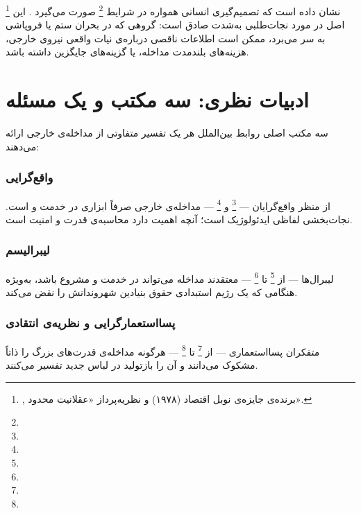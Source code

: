 %
\footnote{,
برنده‌ی جایزه‌ی نوبل اقتصاد (۱۹۷۸) و نظریه‌پرداز «عقلانیت محدود».}
نشان داده است که تصمیم‌گیری انسانی همواره در شرایط \footnote{} صورت می‌گیرد%
. این اصل در مورد نجات‌طلبی به‌شدت
صادق است: گروهی که در بحران ستم یا فروپاشی به سر می‌برد، ممکن است
اطلاعات ناقصی درباره‌ی نیات واقعی نیروی خارجی، هزینه‌های بلندمدت
مداخله، یا گزینه‌های جایگزین داشته باشد.


\section{ادبیات نظری: سه مکتب و یک مسئله}
\label{sec:ch01-theories}

سه مکتب اصلی روابط بین‌الملل هر یک تفسیر متفاوتی از مداخله‌ی خارجی
ارائه می‌دهند:

\begin{tcolorbox}[mybox, title={\rl{سه خوانش نظری از مداخله‌ی خارجی}}]

\subsubsection{واقع‌گرایی}
\label{subsubsec:ch01-realism}
از منظر واقع‌گرایان --- %
\footnote{}
و %
\footnote{} ---
مداخله‌ی خارجی صرفاً ابزاری در خدمت  و
 است. نجات‌بخشی لفاظی ایدئولوژیک است؛
آنچه اهمیت دارد محاسبه‌ی قدرت و امنیت
است.

\subsubsection{لیبرالیسم}
\label{subsubsec:ch01-liberalism}
لیبرال‌ها --- از %
\footnote{}
تا %
\footnote{} ---
معتقدند مداخله می‌تواند در خدمت  و
 مشروع باشد، به‌ویژه هنگامی که یک رژیم
استبدادی حقوق بنیادین شهروندانش را نقض
می‌کند.

\subsubsection{پسااستعمارگرایی و نظریه‌ی انتقادی}
\label{subsubsec:ch01-postcolonial}
متفکران پسااستعماری --- از %
\footnote{}
تا %
\footnote{} ---
هرگونه مداخله‌ی قدرت‌های بزرگ را ذاتاً مشکوک می‌دانند و آن را
بازتولید  در لباس جدید تفسیر
می‌کنند.

\end{tcolorbox}


